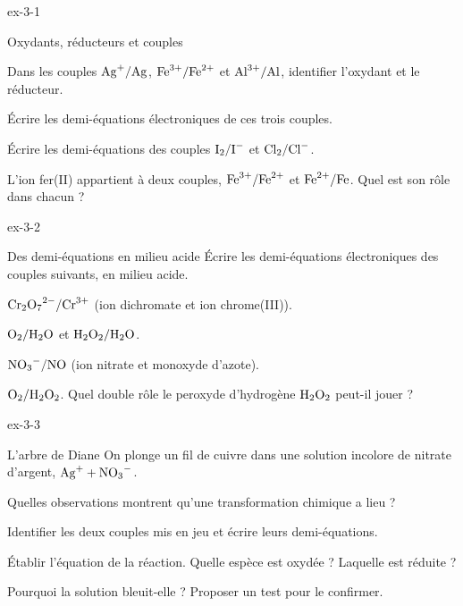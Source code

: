 \begin{blocLivre}{ex-3-1}
\begin{exercice}[1]{Oxydants, réducteurs et couples}
\begin{questions}
\item Dans les couples $\ce{Ag+}/\ce{Ag}$, $\ce{Fe^{3+}}/\ce{Fe^{2+}}$ et $\ce{Al^{3+}}/\ce{Al}$, identifier l'oxydant et le réducteur.
\item Écrire les demi-équations électroniques de ces trois couples.
\item Écrire les demi-équations des couples $\ce{I2}/\ce{I-}$ et $\ce{Cl2}/\ce{Cl-}$.
\item L'ion fer(II) appartient à deux couples, $\ce{Fe^{3+}}/\ce{Fe^{2+}}$ et $\ce{Fe^{2+}}/\ce{Fe}$. Quel est son rôle dans chacun ?
\end{questions}
\end{exercice}
\end{blocLivre}
\begin{blocLivre}{ex-3-2}
\begin{exercice}[1]{Des demi-équations en milieu acide}
Écrire les demi-équations électroniques des couples suivants, en milieu acide.
\begin{questions}
\item $\ce{Cr2O7^{2-}}/\ce{Cr^{3+}}$ (ion dichromate et ion chrome(III)).
\item $\ce{O2}/\ce{H2O}$ et $\ce{H2O2}/\ce{H2O}$.
\item $\ce{NO3-}/\ce{NO}$ (ion nitrate et monoxyde d'azote).
\item $\ce{O2}/\ce{H2O2}$. Quel double rôle le peroxyde d'hydrogène $\ce{H2O2}$ peut-il jouer ?
\end{questions}
\end{exercice}
\end{blocLivre}
\begin{blocLivre}{ex-3-3}
\begin{exercice}[1]{L'arbre de Diane}
On plonge un fil de cuivre dans une solution incolore de nitrate d'argent, $\ce{Ag+}+\ce{NO3-}$.
\begin{questions}
\item Quelles observations montrent qu'une transformation chimique a lieu ?
\item Identifier les deux couples mis en jeu et écrire leurs demi-équations.
\item Établir l'équation de la réaction. Quelle espèce est oxydée ? Laquelle est réduite ?
\item Pourquoi la solution bleuit-elle ? Proposer un test pour le confirmer.
\end{questions}
\end{exercice}
\end{blocLivre}
